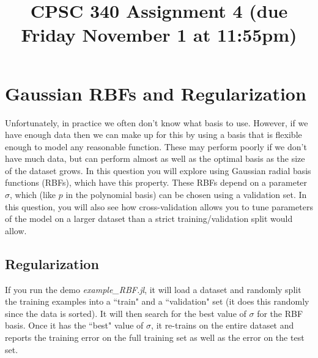 \documentclass{article}
\begin{document}
\title{CPSC 340 Assignment 4  (due Friday November 1 at 11:55pm)}
\author{}
\date{}
\maketitle
\vspace{-4em}



\section{Gaussian RBFs and Regularization}

Unfortunately, in practice we often don't know what basis to use. However, if we have enough data then we can make up for this by using a basis that is flexible enough to model any reasonable function. These may perform poorly if we don't have much data, but can perform almost as well as the optimal basis as the size of the dataset grows. In this question you will explore using Gaussian radial basis functions (RBFs), which have this property. These RBFs depend on a parameter $\sigma$, which (like $p$ in the polynomial basis) can be chosen using a validation set. In this question, you will also see how cross-validation allows you to tune parameters of the model on a larger dataset than a strict training/validation split would allow.

\subsection{Regularization}

If you run the demo \emph{example\_RBF.jl}, it will load a dataset and randomly split the training examples into a ``train" and a ``validation" set (it does this randomly since the data is sorted). It will then search for the best value of $\sigma$ for the RBF basis. Once it has the ``best" value of $\sigma$, it re-trains on the entire dataset and reports the training error on the full training set as well as the error on the test set.
\end{document}
